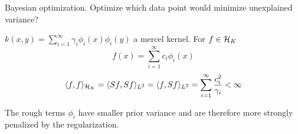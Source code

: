 \begin{aremark}
    Bayesian optimization. Optimize which data point would minimize unexplained variance?
\end{aremark}


$k(x,y)=\sum_{i=1}^\infty\gamma_i\phi_i(x)\phi_i(y)$ a mercel kernel. For $f\in \mathcal{H}_K$
\[f(x)=\sum_{i=1}^\infty c_i \phi_i(x)\]
\begin{align*}
    \langle f,f\rangle_{\mathcal{H}_K}=\langle Sf, Sf\rangle_{L^2}=\langle f,Sf\rangle_{L^2}=\sum_{i=1}^\infty \frac{c_i^2}{\gamma_i}<\infty
\end{align*}

The rough terms $\phi_i$ have smaller prior variance and are therefore more strongly penalized
by the regularization.

